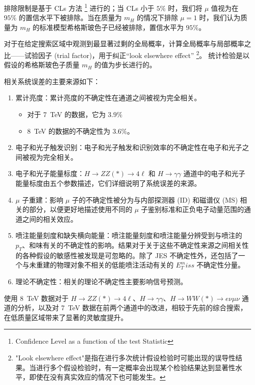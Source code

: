 排除限制是基于 CLs 方法 \footnote{Confidence Level as a function of the test Statistic} 进行的；当 CLs 小于 $5\%$ 时，我们将 $\mu$ 值视为在 $95\%$ 的置信水平下被排除。当在质量为 $m_H$ 的情况下排除 $\mu=1$ 时，我们认为质量为 $m_H$ 的标准模型希格斯玻色子已经被排除，置信水平为 $95\%$。

对于在给定搜索区域中观测到最显著过剩的全局概率，计算全局概率与局部概率之比——试验因子 (trial factor)，用于纠正“look elsewhere effect” \footnote{"Look elsewhere effect"是指在进行多次统计假设检验时可能出现的误导性结果。当进行多个假设检验时，有一定概率会出现某个检验结果达到显著性水平，即使在没有真实效应的情况下也可能发生。}。 统计检验是以假设的希格斯玻色子质量 $m_H$ 的值为步长进行的。

相关系统误差的主要来源如下：

\begin{enumerate}
    \item 累计亮度：累计亮度的不确定性在通道之间被视为完全相关。
        \begin{itemize}
            \item 对于 \qty{7}{TeV} 的数据，它为 $3.9\%$
            \item \qty{8}{TeV} 的数据的不确定性为 $3.6\%$。
        \end{itemize}
    \item 电子和光子触发识别：电子和光子触发和识别效率的不确定性在电子和光子之间被视为完全相关。
    \item 电子和光子能量标度：$H \to ZZ(*) \to 4\ell$ 和 $H\to\gamma\gamma$ 通道中的电子和光子能量标度由五个参数描述，它们详细说明了系统误差的来源。
    \item $\mu$ 子重建：影响 $\mu$ 子的不确定性被分为与内部探测器 (ID) 和磁谱仪 (MS) 相关的部分，以便更好地描述使用不同的 $\mu$ 子鉴别标准和正负电子动量范围的通道之间的相关效应。
    \item 喷注能量刻度和缺失横向能量：喷注能量刻度和喷注能量分辨受到与喷注的 $p_T$、和味有关的不确定性的影响。结果对于关于这些不确定性来源之间相关性的各种假设的敏感性被发现是可忽略的。除了 JES 不确定性外，还包括了一个与未重建的物理对象不相关的低能喷注活动有关的 $E_T^miss$ 不确定性分量。
    \item 理论不确定性：相关的理论不确定性主要影响信号预测。
\end{enumerate}

使用 \qty{8}{TeV} 数据对于 $H\to ZZ(*)\to 4\ell$、$H\to\gamma\gamma$、$H\to WW(*)\to e\nu\mu\nu$ 通道的分析，以及对 \qty{7}{TeV} 数据在前两个通道中的改进，相较于先前的综合搜索，在低质量区域带来了显著的灵敏度提升。

